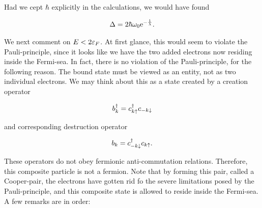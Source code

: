 Had we cept $\hbar$ explicitly in the calculations, we would have found 

\begin{align*}
\Delta = 2\hbar \omega_0 \mathrm{e}^{-\frac{1}{\lambda}}. 
\end{align*}

We next comment on $E < 2\varepsilon_F$. At first glance, this would seem to violate the Pauli-principle, since it looks like we have the two added electrons now residing inside the Fermi-sea. In fact, there is no violation of the Pauli-principle, for the following reason. The bound state must be viewed as an entity, not as two individual electrons. We may think about this as a state created by a creation operator 

\begin{equation}
b^{\dagger}_k = c^{\dagger}_{k \uparrow} c_{-k \downarrow}
\end{equation}

and corresponding destruction operator 

\begin{equation}
b_k = c^{\dagger}_{-k \downarrow} c_{k \uparrow}.
\end{equation}

These operators do not obey fermionic anti-commutation relations. Therefore, this composite particle is not a fermion. Note that by forming this pair, called a Cooper-pair, the electrons have gotten rid fo the severe limitations posed by the Pauli-principle, and this composite state is allowed to reside inside the Fermi-sea. A few remarks are in order: 

